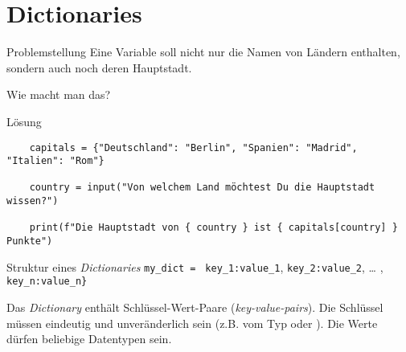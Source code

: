 \section{Dictionaries}

\begin{frame}
\begin{block}{Problemstellung}
\vspace{2pt}
Eine Variable soll nicht nur die Namen von Ländern enthalten, sondern auch noch deren Hauptstadt. 

\vspace{8pt}

Wie macht man das? 
\end{block}
\end{frame}

\begin{fragile}{}
\begin{block}{Lösung}
	\begin{verbatim}
	capitals = {"Deutschland": "Berlin", "Spanien": "Madrid", "Italien": "Rom"}
	
	country = input("Von welchem Land möchtest Du die Hauptstadt wissen?")
	
	print(f"Die Hauptstadt von { country } ist { capitals[country] } Punkte")
	\end{verbatim}
\end{block}
\end{fragile}

\begin{fragile}
	
	\begin{block}{Struktur eines \emph{Dictionaries}}
		\vspace{2pt}
		\large
		\texttt{my\_dict = }\pause {\Large\texttt{\{}}\pause 
		\texttt{key\_1}\pause\texttt{:}\pause\texttt{value\_1}\pause,
		\pause 
		\texttt{key\_2:value\_2}, \pause 
		\dots   
		, \texttt{key\_n:value\_n}\pause \Large{\texttt{\}}}
	\end{block}
	\pause 
	
	Das \emph{Dictionary}  enthält Schlüssel-Wert-Paare (\emph{key-value-pairs}). Die Schlüssel müssen eindeutig und unveränderlich sein (z.B. vom Typ  oder ). Die Werte dürfen beliebige Datentypen sein. 
	
\end{fragile}

